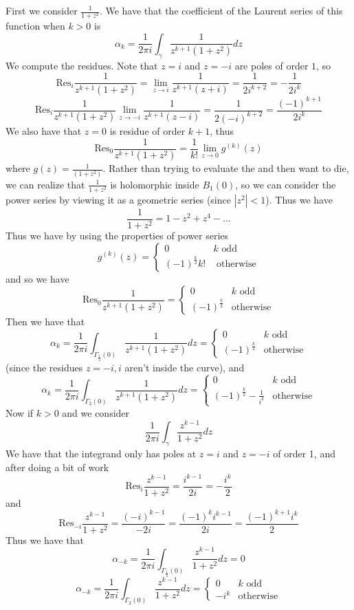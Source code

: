 \documentclass[11pt]{article}
\newcommand{\Res}{\text{Res}}
\begin{document}
\begin{enumerate}[(1)]
First we consider $\frac{1}{1 +z^2}$. We have that the coefficient of the Laurent series of this function when $k > 0$ is 
$$ \alpha_k = \frac{1}{2\pi i} \int_{\gamma} \frac{1}{z^{k+1}(1 + z^2)} dz$$
We compute the residues. Note that $z = i$ and $z = -i$ are poles of order $1$, so 
$$ \Res_i \frac{1}{z^{k+1}(1 + z^2)} = \lim_{z \to i} \frac{1}{z^{k+1}(z + i)} = \frac{1}{2i^{k+2}} = -\frac{1}{2i^k} $$
$$ \Res_i \frac{1}{z^{k+1}(1+z^2)} \lim_{z\to -i} \frac{1}{z^{k+1}(z - i)} = \frac{1}{2(-i)^{k+2}} = \frac{(-1)^{k+1}}{2i^k} $$
We also have that $z = 0$ is residue of order $k+1$, thus 
$$ \Res_0 \frac{1}{z^{k+1}(1 + z^2)} = \frac{1}{k!} \lim_{z \to 0} g^{(k)}(z) $$
where $g(z) = \frac{1}{(1 + z^2)}$. Rather than trying to evaluate the and then want to die, we can realize that $\frac{1}{1 + z^2}$ is holomorphic inside $B_1(0)$, so we can consider the power series by viewing it as a geometric series (since $|z^2| < 1$). Thus we have 
$$ \frac{1}{ 1 + z^2} = 1 - z^2 + z^4 -... $$
Thus we have by using the properties of power series
$$ g^{(k)}(z) = \begin{cases} 0 & k \text{ odd} \\ (-1)^\frac{k}{2}k! & \text{ otherwise} \end{cases} $$
and so we have 
$$ \Res_0 \frac{1}{z^{k+1}(1+z^2)} = \begin{cases} 0 & k \text{ odd} \\ (-1)^\frac{k}{2} & \text{otherwise} \end{cases}$$
Then we have that 
$$ \alpha_k = \frac{1}{2\pi i}\int_{\Gamma_\frac{1}{2}(0)} \frac{1}{z^{k+1}(1 + z^2)} dz = \begin{cases} 0 & k \text{ odd} \\ (-1)^\frac{k}{2} & \text{otherwise} \end{cases} $$
(since the residues $z = -i, i$ aren't inside the curve), and 
$$ \alpha_k = \frac{1}{2\pi i} \int_{\Gamma_2(0)} \frac{1}{z^{k+1}(1+z^2)} dz = \begin{cases} 0 & k \text{ odd} \\ (-1)^\frac{k}{2} - \frac{1}{i^k} & \text{otherwise} \end{cases} $$
Now if $k>0$ and we consider
$$ \frac{1}{2\pi i} \int_\gamma \frac{z^{k-1}}{1 + z^2} dz $$
We have that the integrand only has poles at $z = i$ and $z = -i$ of order 1, and after doing a bit of work
$$ \Res_i \frac{z^{k-1}}{1 + z^2} = \frac{i^{k-1}}{2i} = - \frac{i^k}{2} $$
and
$$ \Res_{-i} \frac{z^{k-1}}{1 + z^2} = \frac{(-i)^{k-1}}{-2i} = \frac{(-1)^k i^{k-1}}{2i} = \frac{(-1)^{k+1}i^k}{2}$$
Thus we have that 
$$ \alpha_{-k} = \frac{1}{2\pi i} \int_{\Gamma_\frac{1}{2}(0)} \frac{z^{k-1}}{1 + z^2} dz = 0 $$
$$ \alpha_{-k} = \frac{1}{2\pi i} \int_{\Gamma_2(0)} \frac{z^{k-1}}{1 + z^2} dz =\begin{cases} 0 & k \text{ odd} \\ -i^k & \text{otherwise} \end{cases}$$


\end{enumerate}
\end{document}
